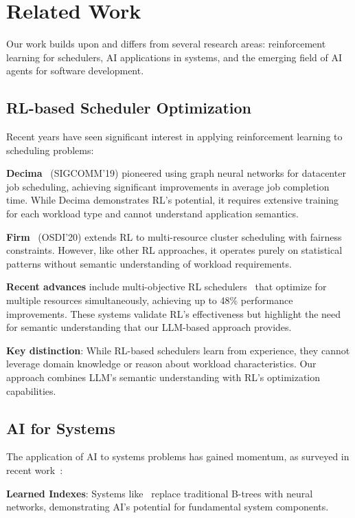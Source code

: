 \section{Related Work}

Our work builds upon and differs from several research areas: reinforcement learning for schedulers, AI applications in systems, and the emerging field of AI agents for software development.

\subsection{RL-based Scheduler Optimization}

Recent years have seen significant interest in applying reinforcement learning to scheduling problems:

\textbf{Decima}~\cite{mao2019decima} (SIGCOMM'19) pioneered using graph neural networks for datacenter job scheduling, achieving significant improvements in average job completion time. While Decima demonstrates RL's potential, it requires extensive training for each workload type and cannot understand application semantics.

\textbf{Firm}~\cite{qiu2020firm} (OSDI'20) extends RL to multi-resource cluster scheduling with fairness constraints. However, like other RL approaches, it operates purely on statistical patterns without semantic understanding of workload requirements.

\textbf{Recent advances} include multi-objective RL schedulers~\cite{zhang2024mrsch} that optimize for multiple resources simultaneously, achieving up to 48\% performance improvements. These systems validate RL's effectiveness but highlight the need for semantic understanding that our LLM-based approach provides.

\textbf{Key distinction}: While RL-based schedulers learn from experience, they cannot leverage domain knowledge or reason about workload characteristics. Our approach combines LLM's semantic understanding with RL's optimization capabilities.

\subsection{AI for Systems}

The application of AI to systems problems has gained momentum, as surveyed in recent work~\cite{zhang2024aisurvey}:

\textbf{Learned Indexes}: Systems like~\cite{kraska2018learned} replace traditional B-trees with neural networks, demonstrating AI's potential for fundamental system components.

